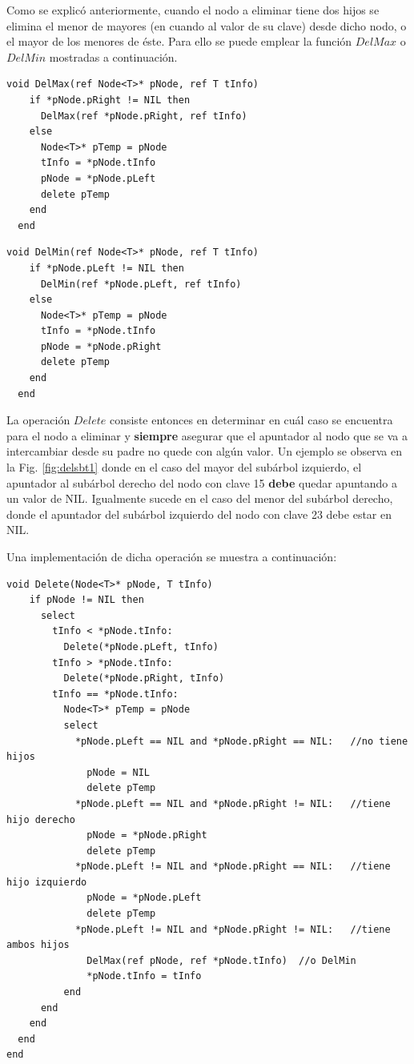 Como se explicó anteriormente, cuando el nodo a eliminar tiene dos hijos se elimina el menor de mayores (en cuando al valor de su clave) desde dicho nodo, o el mayor de los menores de éste. Para ello se puede emplear la función $DelMax$ o $DelMin$ mostradas a continuación.

\begin{lstlisting}[upquote=true, language=pseudo]  
  void DelMax(ref Node<T>* pNode, ref T tInfo)
    if *pNode.pRight != NIL then
      DelMax(ref *pNode.pRight, ref tInfo)
    else
      Node<T>* pTemp = pNode
      tInfo = *pNode.tInfo
      pNode = *pNode.pLeft
      delete pTemp
    end
  end
\end{lstlisting}

\begin{lstlisting}[upquote=true, language=pseudo]  
  void DelMin(ref Node<T>* pNode, ref T tInfo)
    if *pNode.pLeft != NIL then
      DelMin(ref *pNode.pLeft, ref tInfo)
    else
      Node<T>* pTemp = pNode
      tInfo = *pNode.tInfo
      pNode = *pNode.pRight
      delete pTemp
    end
  end
\end{lstlisting}  

La operación $Delete$ consiste entonces en determinar en cuál caso se encuentra para el nodo a eliminar y \textbf{siempre} asegurar que el apuntador al nodo que se va a intercambiar desde su padre no quede con algún valor. Un ejemplo se observa en la Fig. \ref{fig:delsbt1} donde en el caso del mayor del subárbol izquierdo, el apuntador al subárbol derecho del nodo con clave 15 \textbf{debe} quedar apuntando a un valor de NIL. Igualmente sucede en el caso del menor del subárbol derecho, donde el apuntador del subárbol izquierdo del nodo con clave 23 debe estar en NIL. 

Una implementación de dicha operación se muestra a continuación:

\begin{lstlisting}[upquote=true, language=pseudo]   
  void Delete(Node<T>* pNode, T tInfo)
    if pNode != NIL then
      select
        tInfo < *pNode.tInfo:
          Delete(*pNode.pLeft, tInfo)
        tInfo > *pNode.tInfo:
          Delete(*pNode.pRight, tInfo)
        tInfo == *pNode.tInfo:
          Node<T>* pTemp = pNode
          select
            *pNode.pLeft == NIL and *pNode.pRight == NIL:	//no tiene hijos
              pNode = NIL
              delete pTemp
            *pNode.pLeft == NIL and *pNode.pRight != NIL:	//tiene hijo derecho
              pNode = *pNode.pRight
              delete pTemp
            *pNode.pLeft != NIL and *pNode.pRight == NIL:	//tiene hijo izquierdo
              pNode = *pNode.pLeft
              delete pTemp
            *pNode.pLeft != NIL and *pNode.pRight != NIL:	//tiene ambos hijos
              DelMax(ref pNode, ref *pNode.tInfo)  //o DelMin
              *pNode.tInfo = tInfo
          end
      end
    end
  end
end
\end{lstlisting}

